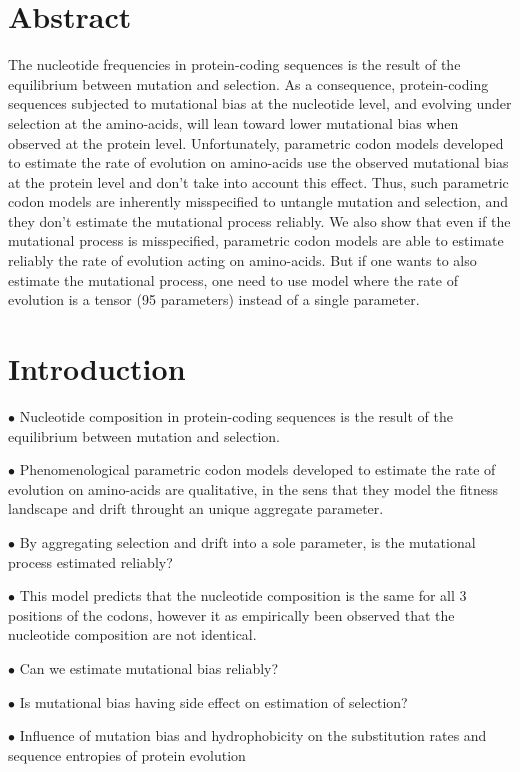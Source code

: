 \section{Abstract}

The nucleotide frequencies in protein-coding sequences is the result of the equilibrium between mutation and selection.
As a consequence, protein-coding sequences subjected to mutational bias at the nucleotide level, and evolving under selection at the amino-acids, will lean toward lower mutational bias when observed at the protein level.
Unfortunately, parametric \gls{codon} models developed to estimate the rate of evolution on amino-acids use the observed mutational bias at the protein level and don't take into account this effect.
Thus, such parametric \gls{codon} models are inherently misspecified to untangle mutation and selection, and they don’t estimate the mutational process reliably.
We also show that even if the mutational process is misspecified, parametric \gls{codon} models are able to estimate reliably the rate of evolution acting on amino-acids.
But if one wants to also estimate the mutational process, one need to use model where the rate of evolution is a tensor (95 parameters) instead of a single parameter.


\section{Introduction}

$\bullet$ Nucleotide composition in protein-coding sequences is the result of the equilibrium between mutation and selection.

$\bullet$ Phenomenological parametric \gls{codon} models developed to estimate the rate of evolution on amino-acids are qualitative, in the sens that they model the fitness landscape and drift throught an unique aggregate parameter.

$\bullet$ By aggregating selection and drift into a sole parameter, is the mutational process estimated reliably?

$\bullet$ This model predicts that the nucleotide composition is the same for all $3$ positions of the codons, however it as empirically been observed that the nucleotide composition are not identical.

$\bullet$ Can we estimate mutational bias reliably?

$\bullet$ Is mutational bias having side effect on estimation of selection?

$\bullet$ Influence of mutation bias and hydrophobicity on the substitution rates and sequence entropies of protein evolution \citet{Santos2018}

